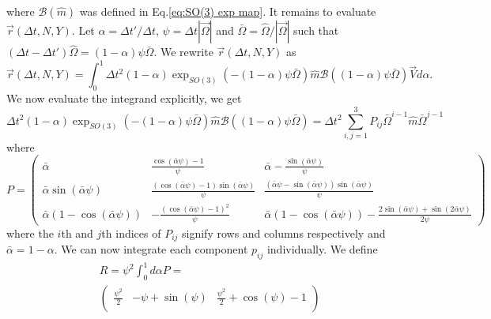 \documentclass[withindex,glossary,techreport]{cam-thesis}
\begin{document}
\begin{appendices}
where $\mathscr{B}(\hat{m})$ was defined in Eq.\ref{eq:SO(3) exp map}. It remains to evaluate $\vec{r}(\Delta t, N, Y)$. Let $\alpha = \Delta t' / \Delta t$, $\psi = \Delta t |\vec{\Omega}|$ and $\bar{\Omega} = \hat{\Omega} /|\vec{\Omega}|$ such that $(\Delta t - \Delta t') \hat{\Omega} = (1- \alpha) \psi \bar{\Omega}$. We rewrite $\vec{r}(\Delta t, N, Y)$ as
\begin{equation}
	\vec{r} (\Delta t, N, Y) = \int_0^1 \Delta t^2 (1-\alpha) \exp_{SO(3)}( - (1-\alpha) \psi \bar{\Omega}) \hat{m} \mathscr{B}((1-\alpha) \psi \bar{\Omega}) \vec{V} d \alpha.
\end{equation}
We now evaluate the integrand explicitly, we get
\begin{equation} \label{eq:SE(3) propagator calc 1}
	\Delta t^2 (1-\alpha) \exp_{SO(3)}( - (1-\alpha) \psi \bar{\Omega}) \hat{m} \mathscr{B}((1-\alpha) \psi \bar{\Omega})  = \Delta t^2 \sum_{i,j=1}^{3} P_{ij} \bar{\Omega}^{i-1} \hat{m} \bar{\Omega}^{j-1}
\end{equation}
where
\small
\begin{equation}
P = \begin{pmatrix}
\bar{\alpha} & \frac{\cos{\left(\bar{\alpha} \psi \right)} - 1}{\psi} & \bar{\alpha} - \frac{\sin{\left(\bar{\alpha} \psi \right)}}{\psi}\\\bar{\alpha} \sin{\left(\bar{\alpha} \psi \right)} & \frac{\left(\cos{\left(\bar{\alpha} \psi \right)} - 1\right) \sin{\left(\bar{\alpha} \psi \right)}}{\psi} & \frac{\left(\bar{\alpha} \psi - \sin{\left(\bar{\alpha} \psi \right)}\right) \sin{\left(\bar{\alpha} \psi \right)}}{\psi}\\\bar{\alpha} \left(1 - \cos{\left(\bar{\alpha} \psi \right)}\right) & - \frac{\left(\cos{\left(\bar{\alpha} \psi \right)} - 1\right)^{2}}{\psi} & 
\bar{\alpha} ( 1 - \cos{\left(\bar{\alpha} \psi \right)}) - 
\frac{ 2\sin{\left(\bar{\alpha} \psi \right)} + \sin{\left(2 \bar{\alpha} \psi \right)} }{2 \psi} 
\end{pmatrix}
\end{equation}
\normalsize
where the $i$th and $j$th indices of $P_{ij}$ signify rows and columns respectively and $\bar{\alpha} = 1 - \alpha$. We can now integrate each component $p_{ij}$ individually. We define
\footnotesize
\begin{equation} \label{eq:geometric integrator R matrix}
\begin{aligned}
	& R = \psi^2 \int_0^1 d\alpha P =  \\
	& \begin{pmatrix}
\frac{\psi^{2}}{2} & - \psi + \sin{\left(\psi \right)} & \frac{\psi^{2}}{2} + \cos{\left(\psi \right)} - 1\\

\end{pmatrix}
\end{aligned}
\end{equation}
\end{appendices}
\end{document}
